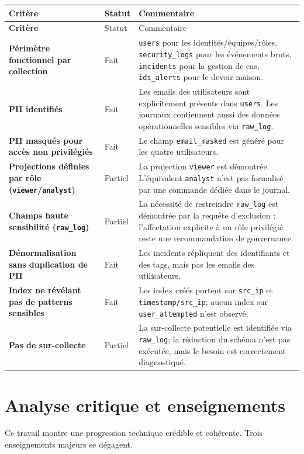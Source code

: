 \documentclass[11pt,a4paper]{article}
\begin{document}
\begin{longtable}{>{\bfseries}p{5.1cm}p{2cm}p{7.0cm}}
\toprule
Critère & Statut & Commentaire \\
\midrule
\endfirsthead
\toprule
Critère & Statut & Commentaire \\
\midrule
\endhead
Périmètre fonctionnel par collection & Fait & \texttt{users} pour les identités/équipes/rôles, \texttt{security\_logs} pour les événements bruts, \texttt{incidents} pour la gestion de cas, \texttt{ids\_alerts} pour le devoir maison. \\
PII identifiés & Fait & Les emails des utilisateurs sont explicitement présents dans \texttt{users}. Les journaux contiennent aussi des données opérationnelles sensibles via \texttt{raw\_log}. \\
PII masqués pour accès non privilégiés & Fait & Le champ \texttt{email\_masked} est généré pour les quatre utilisateurs. \\
Projections définies par rôle (\texttt{viewer}/\texttt{analyst}) & Partiel & La projection \texttt{viewer} est démontrée. L'équivalent \texttt{analyst} n'est pas formalisé par une commande dédiée dans le journal. \\
Champs haute sensibilité (\texttt{raw\_log}) & Partiel & La nécessité de restreindre \texttt{raw\_log} est démontrée par la requête d'exclusion ; l'affectation explicite à un rôle privilégié reste une recommandation de gouvernance. \\
Dénormalisation sans duplication de PII & Fait & Les incidents répliquent des identifiants et des tags, mais pas les emails des utilisateurs. \\
Index ne révélant pas de patterns sensibles & Fait & Les index créés portent sur \texttt{src\_ip} et \texttt{timestamp/src\_ip}; aucun index sur \texttt{user\_attempted} n'est observé. \\
Pas de sur-collecte & Partiel & La sur-collecte potentielle est identifiée via \texttt{raw\_log}; la réduction du schéma n'est pas exécutée, mais le besoin est correctement diagnostiqué. \\
\bottomrule
\end{longtable}

\section{Analyse critique et enseignements}

Ce travail montre une progression technique crédible et cohérente. Trois enseignements majeurs se dégagent.
\end{document}
